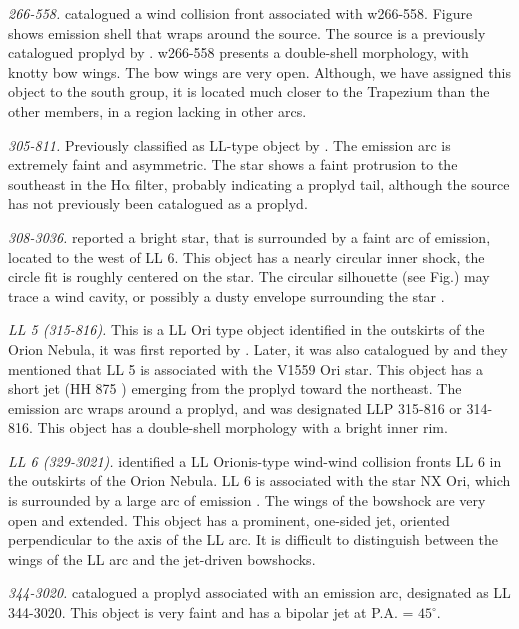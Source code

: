 \documentclass[iop, apj]{emulateapj}
\newcommand\ha{\ensuremath{\mathrm{H\alpha}}}
\begin{document}
\textit{266-558.} \citet{Bally:2000a} catalogued a wind collision front associated with w266-558. Figure shows emission shell that wraps around the source. The source is a previously catalogued proplyd by \citet{Ricci:2008a}. w266-558 presents a double-shell morphology, with knotty bow wings. The bow wings are very open. Although, we have assigned this object to the south group, it is located much closer to the Trapezium than the other members, in a region lacking in other arcs.

\textit{305-811.} Previously classified as LL-type object by \citet{Bally:2006a}. The emission arc is extremely faint and asymmetric. The star shows  a faint protrusion to the southeast in the \ha{} filter, probably indicating a proplyd tail, although the source has not previously been catalogued as a proplyd.    

\textit{308-3036.} \citet{Bally:2006a} reported a bright star, that is surrounded by a faint arc of emission, located to the west of LL 6. This object has a nearly circular inner shock, the circle fit is roughly centered on the star. The circular silhouette (see Fig.) may trace a wind cavity, or possibly a dusty envelope surrounding the star \citep{Bally:2006a}.       

\textit{LL 5 (315-816).} This is a LL Ori type object identified in the outskirts of the Orion Nebula, it was first reported by \citet{Bally:2001a}. Later, it was also catalogued by \citet{Bally:2006a} and they mentioned that LL 5 is associated with the  V1559 Ori star. This object has a short jet (HH 875 \citealp{Bally:2006a}) emerging from the proplyd toward the northeast.  The emission arc wraps around a proplyd, and was designated LLP 315-816 or 314-816. This object has a double-shell morphology with a bright inner rim.
       
\textit{LL 6 (329-3021).} \citep{Bally:2001a} identified a LL Orionis-type wind-wind collision fronts LL 6 in the outskirts of the Orion Nebula. LL 6 is associated with the star NX Ori, which is surrounded by a large arc of emission \citep{Bally:2006a}. The wings of the bowshock are very open and extended. This object has a prominent, one-sided jet, oriented perpendicular to the axis of the LL arc. It is difficult to distinguish between the wings of the LL arc and the jet-driven bowshocks.    

\textit{344-3020.} \citet{Bally:2006a} catalogued a proplyd associated with an emission arc, designated as LL 344-3020. This object is very faint and has a bipolar jet at P.A. = $45^{\circ}$.     
\end{document}
